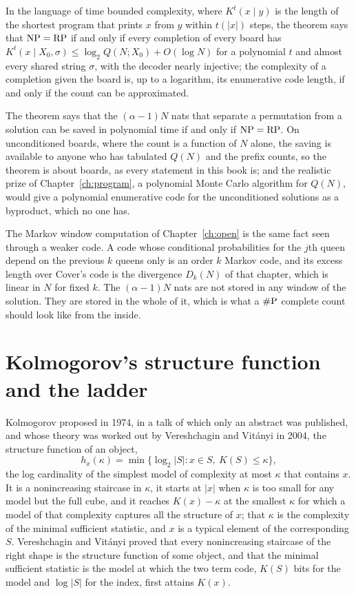 In the language of time bounded complexity, where $K^t(x \mid y)$ is the length of the shortest program that prints $x$ from $y$ within $t(|x|)$ steps, the theorem says that $\mathrm{NP} = \mathrm{RP}$ if and only if every completion of every board has $K^t(x \mid X_0, \sigma) \le \log_2 Q(N; X_0) + O(\log N)$ for a polynomial $t$ and almost every shared string $\sigma$, with the decoder nearly injective; the complexity of a completion given the board is, up to a logarithm, its enumerative code length, if and only if the count can be approximated.

The theorem says that the $(\alpha - 1) N$ nats that separate a permutation from a solution can be saved in polynomial time if and only if $\mathrm{NP} = \mathrm{RP}$. On unconditioned boards, where the count is a function of $N$ alone, the saving is available to anyone who has tabulated $Q(N)$ and the prefix counts, so the theorem is about boards, as every statement in this book is; and the realistic prize of Chapter~\ref{ch:program}, a polynomial Monte Carlo algorithm for $Q(N)$, would give a polynomial enumerative code for the unconditioned solutions as a byproduct, which no one has.

The Markov window computation of Chapter~\ref{ch:open} is the same fact seen through a weaker code. A code whose conditional probabilities for the $j$th queen depend on the previous $k$ queens only is an order $k$ Markov code, and its excess length over Cover's code is the divergence $D_k(N)$ of that chapter, which is linear in $N$ for fixed $k$. The $(\alpha - 1) N$ nats are not stored in any window of the solution. They are stored in the whole of it, which is what a $\#\mathrm{P}$ complete count should look like from the inside.

\section{Kolmogorov's structure function and the ladder}

Kolmogorov proposed in 1974, in a talk of which only an abstract was published, and whose theory was worked out by Vereshchagin and Vit\'anyi \cite{VereshchaginVitanyi} in 2004, the structure function of an object,
\[
h_x(\kappa) = \min\{ \log_2 |S| : x \in S, \ K(S) \le \kappa \} ,
\]
the log cardinality of the simplest model of complexity at most $\kappa$ that contains $x$. It is a nonincreasing staircase in $\kappa$, it starts at $|x|$ when $\kappa$ is too small for any model but the full cube, and it reaches $K(x) - \kappa$ at the smallest $\kappa$ for which a model of that complexity captures all the structure of $x$; that $\kappa$ is the complexity of the minimal sufficient statistic, and $x$ is a typical element of the corresponding $S$. Vereshchagin and Vit\'anyi proved that every nonincreasing staircase of the right shape is the structure function of some object, and that the minimal sufficient statistic is the model at which the two term code, $K(S)$ bits for the model and $\log |S|$ for the index, first attains $K(x)$.


